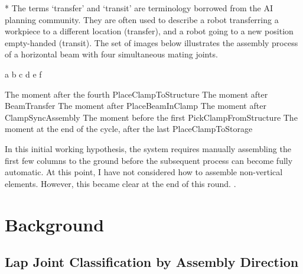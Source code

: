 * The terms ‘transfer’ and ‘transit’ are terminology borrowed from the AI planning community. They are often used to describe a robot transferring a workpiece to a different location (transfer), and a robot going to a new position empty-handed (transit).
The set of images below illustrates the assembly process of a horizontal beam with four simultaneous mating joints. 

a
b
c
d
e
f

The moment after the fourth PlaceClampToStructure 
The moment after BeamTransfer
The moment after PlaceBeamInClamp
The moment after ClampSyncAssembly
The moment before the first PickClampFromStructure
The moment at the end of the cycle, after the last PlaceClampToStorage

In this initial working hypothesis, the system requires manually assembling the first few columns to the ground before the subsequent process can become fully automatic. At this point, I have not considered how to assemble non-vertical elements. However, this became clear at the end of this round. .

\section{Background}
\label{section:exploration-1-background}

\subsection{Lap Joint Classification by Assembly Direction}
\label{subsection:exploration-1-lap-joint-classification-by-assembly-direction}

